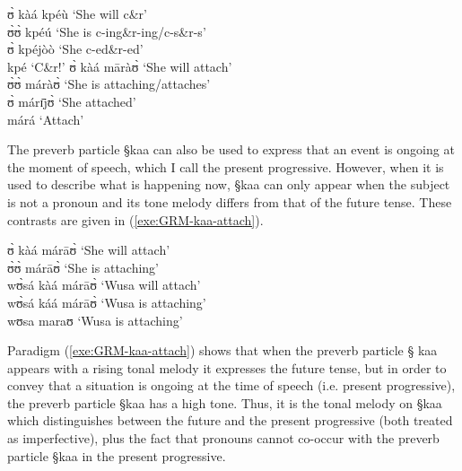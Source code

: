 \begin{exe}
\ex\label{exe:GRM-crack-remove-attach}
\begin{xlist}
\ex

 ʊ̀ kàá kpéù   `She will c\&r'\\
   ʊ̀ʊ̀ kpéú   	 `She  is c-ing\&r-ing/c-s\&r-s'\\
   ʊ̀ kpéjòò   `She   c-ed\&r-ed'\\
   kpé  		 `C\&r!'
\ex
 ʊ̀ kàá māràʊ̀   `She will attach'\\
   ʊ̀ʊ̀ máràʊ̀   	 `She  is attaching/attaches'\\
  ʊ̀ márɪ̄jʊ̀    `She   attached'\\
   márá		 `Attach'
\end{xlist}
\end{exe}


The preverb particle {\S kaa} can also be used to express that an event is
ongoing at the moment of speech, which I call the present 
progressive.   However,  when it is used to describe what is happening
now, {\S kaa} can only appear when the subject is not a pronoun and its tone
melody differs from that of the future tense. These contrasts are given in
(\ref{exe:GRM-kaa-attach}).

\begin{exe}
\ex\label{exe:GRM-kaa-attach}
 ʊ̀ kàá márāʊ̀   `She will attach'\\
   ʊ̀ʊ̀ márāʊ̀   	 `She  is attaching'\\
wʊ̀sá kàá márāʊ̀   `Wusa will attach'\\
wʊ̀sá káá márāʊ̀   `Wusa is attaching'\\
\textasteriskcentered  wʊsa   maraʊ  	  `Wusa is
attaching'
\end{exe}

Paradigm  (\ref{exe:GRM-kaa-attach}) shows that when the preverb particle {\S
kaa} appears with a rising tonal melody it  expresses the future tense, but  in
order to convey that a situation is ongoing at the time of speech (i.e. present
progressive), the preverb particle {\S kaa} has a high tone. Thus, it is the
tonal melody on {\S kaa} which distinguishes between the future and the present
progressive (both treated as imperfective),  plus the fact that pronouns cannot
co-occur with the preverb particle {\S kaa} in the present progressive. 



